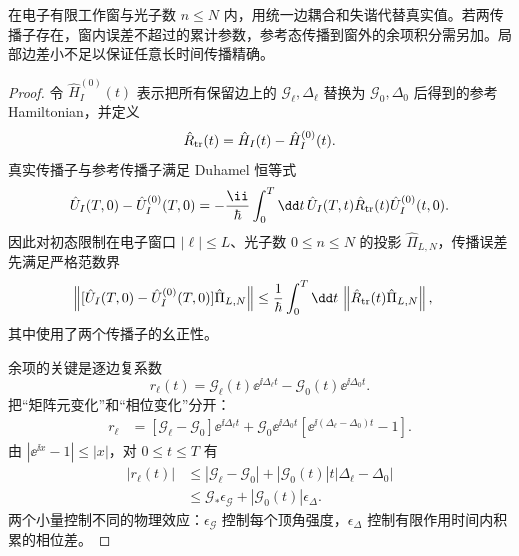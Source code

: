 \begin{proposition}
在电子有限工作窗与光子数 $n\le N$ 内，用统一边耦合和失谐代替真实值。若两传播子存在，窗内误差不超过的累计参数，参考态传播到窗外的余项积分需另加。局部边差小不足以保证任意长时间传播精确。
\end{proposition}
\begin{proof}
令 $\hat H_I^{(0)}(t)$ 表示把所有保留边上的
$\mathcal G_\ell,\Delta_\ell$ 替换为 $\mathcal G_0,\Delta_0$ 后得到的参考 Hamiltonian，并定义
\[
 \hat R_{\rm tr}(t)=\hat H_I(t)-\hat H_I^{(0)}(t).
\]
真实传播子与参考传播子满足 Duhamel 恒等式
\begin{equation*}
 \hat U_I(T,0)-\hat U_I^{(0)}(T,0)
 =-\frac{\ii}{\hbar}\int_0^T\dd t\,
 \hat U_I(T,t)\hat R_{\rm tr}(t)\hat U_I^{(0)}(t,0).
\end{equation*}
因此对初态限制在电子窗口 $|\ell|\le L$、光子数 $0\le n\le N$ 的投影
$\hat\Pi_{L,N}$，传播误差先满足严格范数界
\begin{align*}
 \left\|
 [\hat U_I(T,0)-\hat U_I^{(0)}(T,0)]\hat\Pi_{L,N}
 \right\|
 &\le\frac1\hbar\int_0^T\dd t\,
 \left\|\hat R_{\rm tr}(t)\hat\Pi_{L,N}\right\|,
\end{align*}
其中使用了两个传播子的幺正性。

余项的关键是逐边复系数
\[
 r_\ell(t)
 =\mathcal G_\ell(t)\ee^{\ii\Delta_\ell t}
  -\mathcal G_0(t)\ee^{\ii\Delta_0t}.
\]
把“矩阵元变化”和“相位变化”分开：
\begin{align*}
 r_\ell
 &=[\mathcal G_\ell-\mathcal G_0]\ee^{\ii\Delta_\ell t}
 +\mathcal G_0\ee^{\ii\Delta_0t}
 \left[\ee^{\ii(\Delta_\ell-\Delta_0)t}-1\right].
\end{align*}
由 $|\ee^{\ii x}-1|\le |x|$，对 $0\le t\le T$ 有
\begin{align*}
 |r_\ell(t)|
 &\le |\mathcal G_\ell-\mathcal G_0|
 +|\mathcal G_0(t)|t|\Delta_\ell-\Delta_0|\\
 &\le \mathcal G_*\epsilon_{\mathcal G}
 +|\mathcal G_0(t)|\epsilon_\Delta.
\end{align*}
两个小量控制不同的物理效应：$\epsilon_{\mathcal G}$ 控制每个顶角强度，$\epsilon_\Delta$ 控制有限作用时间内积累的相位差。


\end{proof}
